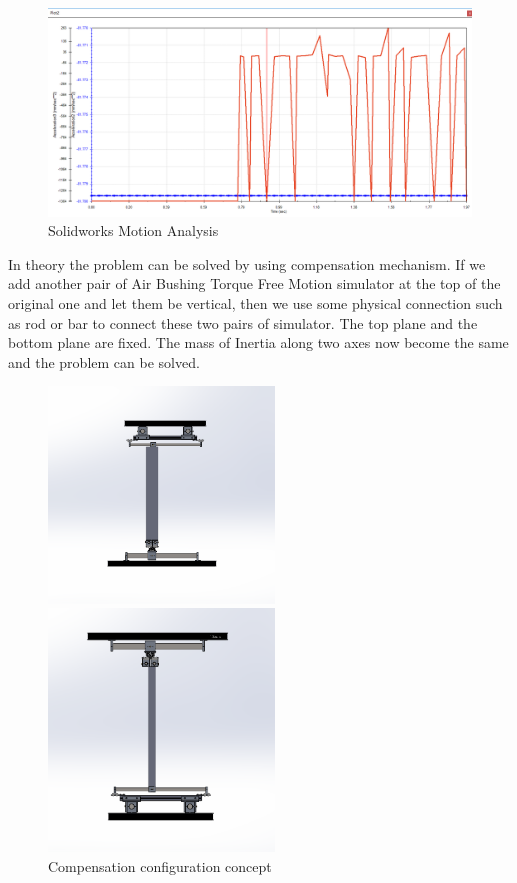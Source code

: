 \begin{figure}[H]
\centering
\includegraphics[width=\linewidth]{fig/DOE/MotionAnalysis}
\caption{Solidworks Motion Analysis}\label{Resulte of analysis} 
\end{figure} 

In theory the problem can be solved by using compensation mechanism. If we add another pair of Air Bushing Torque Free Motion simulator at the top of the original one and let them be vertical, then we use some physical connection such as rod or bar to connect these two pairs of simulator. The top plane and the bottom plane are fixed. The mass of Inertia along two axes now become the same and the problem can be solved. 

\begin{figure}[H]
\centering
\begin{minipage}[t]{0.48\textwidth}
\centering
\includegraphics[width=6cm]{fig/DOE/FrontView}
\end{minipage}
\begin{minipage}[t]{0.48\textwidth}
\centering
\includegraphics[width=6cm]{fig/DOE/RightView}
\end{minipage}
\caption{Compensation configuration concept}
\end{figure}

